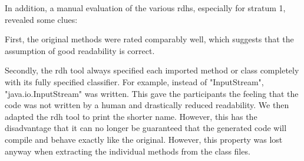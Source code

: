 \documentclass[%
class=scrreprt,
chapterprefix=false,%
open=right,%
twoside=false,%
paper=a4,%
logofile={Logo\_zentral\_farbig\_EN.png},%
thesistype=master,%
UKenglish,%
]{se2thesis}
\theoremstyle{definition}
\begin{document}
	
	In addition, a manual evaluation of the various rdhs, especially for stratum 1, revealed some clues:
	
	First, the original methods were rated comparably well, which suggests that the assumption of good readability is correct.
	
	Secondly, the rdh tool always specified each imported method or class completely with its fully specified classifier. For example, instead of "InputStream", "java.io.InputStream" was written. This gave the participants the feeling that the code was not written by a human and drastically reduced readability. We then adapted the rdh tool to print the shorter name. However, this has the disadvantage that it can no longer be guaranteed that the generated code will compile and behave exactly like the original. However, this property was lost anyway when extracting the individual methods from the class files.
	
\end{document}
